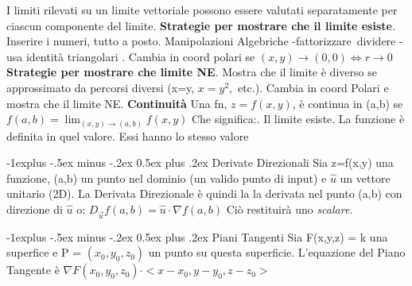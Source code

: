 \documentclass[10pt,landscape]{article}
\makeatletter
\renewcommand{\subsection}{\@startsection{subsection}{2}{0mm}%
                                {-1explus -.5ex minus -.2ex}%
                                {0.5ex plus .2ex}%
                                {\normalfont\normalsize\bfseries}}
\makeatother
\begin{document}
\begin{multicols*}{5}
I limiti rilevati su un limite vettoriale possono essere valutati separatamente per ciascun componente del limite.\newline
\textbf{Strategie per mostrare che il limite esiste}. Inserire i numeri, tutto a posto. Manipolazioni Algebriche\newline
-fattorizzare\ dividere \newline
-usa identità triangolari . Cambia in coord polari \newline
se \:\:$ (x,y)\to(0,0)\Leftrightarrow r\to0$\newline
\textbf{Strategie per mostrare che limite NE}. Mostra che il limite \`e  diverso se approssimato da percorsi diversi \newline
(x=y, $x=y^2,$ etc.). Cambia in coord Polari e mostra che il limite NE.\newline
\textbf{Continuit\`a}\newline
Una fn, $z=f(x,y)$, \`e  continua in (a,b) se \newline
$f(a,b) = \lim_{(x,y) \to (a,b)} f(x,y) $\newline
Che significa:. Il limite esiste. La funzione \`e definita in quel valore. Essi hanno lo stesso valore

\subsection{ Derivate Direzionali}
Sia z=f(x,y) una funzione, (a,b) un punto nel  dominio (un valido  punto di input) e  $ \hat{u} $ un vettore unitario (2D).\newline
La Derivata Direzionale \`e quindi la la derivata nel punto (a,b) con direzione di $ \hat{u} $ o:\newline
$ D_{\vec{u}}f(a,b) = \hat{u} \cdot \nabla f(a,b)$\newline
Ciò restituir\`a uno \textit{scalare}. \newline

\subsection{Piani Tangenti}
Sia F(x,y,z) = k una superfice e  P = $(x_0, y_0, z_0)$ un punto su questa superficie.\newline
L'equazione del Piano Tangente \`e \newline
$ \nabla F(x_0,y_0,z_0) \cdot <x-x_0, y-y_0, z-z_0> $


\end{multicols*}
\end{document}
